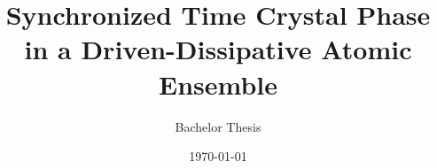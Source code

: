 \documentclass{if-beamer}
\title[Bachelor Presentation]{\textbf{Synchronized Time Crystal Phase in a
Driven-Dissipative Atomic Ensemble}}
\subtitle{Bachelor Thesis}
\author[Christian Gommeringer]{\large \negrito{Christian Gommeringer}}
\institute[AG Lesanovsky]{
    \small \textit{AG Lesanovsky} 
}
\date{\today}
\begin{document}
\begin{frame}
  \titlepage
\end{frame}






\end{document}
